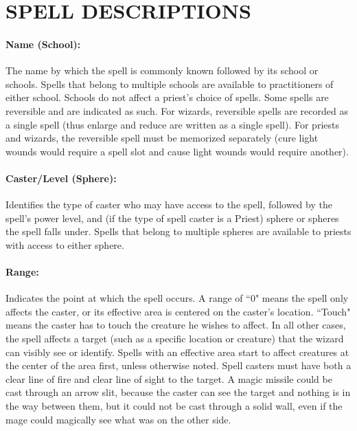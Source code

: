 \begin{multicols}{2}
\begin{tabular}{|p{}|p{}|p{}|}
\hline
\end{tabular}

\section{SPELL DESCRIPTIONS}

\paragraph{Name (School):} The name by which the spell is commonly known followed by its school or schools.  Spells that belong to multiple schools are available to practitioners of either school.  Schools do not affect a priest's choice of spells.  Some spells are reversible and are indicated as such.  For wizards, reversible spells are recorded as a single spell (thus enlarge and reduce are written as a single spell).  For priests and wizards, the reversible spell must be memorized separately (cure light wounds would require a spell slot and cause light wounds would require another).  

\paragraph{Caster/Level (Sphere):} Identifies the type of caster who may have access to the spell, followed by the spell's power level, and (if the type of spell caster is a Priest) sphere or spheres the spell falls under.  Spells that belong to multiple spheres are available to priests with access to either sphere. 

\paragraph{Range:} Indicates the point at which the spell occurs.  A range of ``0" means the spell only affects the caster, or its effective area is centered on the caster's location.  ``Touch" means the caster has to touch the creature he wishes to affect.  In all other cases, the spell affects a target (such as a specific location or creature) that the wizard can visibly see or identify.  Spells with an effective area start to affect creatures at the center of the area first, unless otherwise noted.  Spell casters must have both a clear line of fire and clear line of sight to the target.  A magic missile could be cast through an arrow slit, because the caster can see the target and nothing is in the way between them, but it could not be cast through a solid wall, even if the mage could magically see what was on the other side.


\end{multicols}
